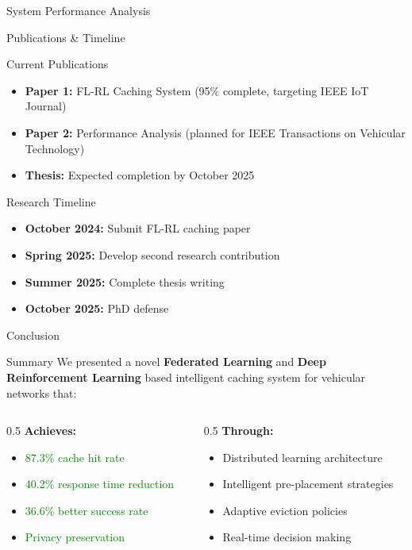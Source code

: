 \documentclass[aspectratio=169]{beamer}
\begin{document}
\begin{frame}{System Performance Analysis}
\begin{frame}{Publications \& Timeline}
\begin{block}{Current Publications}
\begin{itemize}
\item \textbf{Paper 1:} FL-RL Caching System (95\% complete, targeting IEEE IoT Journal)
\item \textbf{Paper 2:} Performance Analysis (planned for IEEE Transactions on Vehicular Technology)
\item \textbf{Thesis:} Expected completion by October 2025
\end{itemize}
\end{block}

\begin{block}{Research Timeline}
\begin{itemize}
\item \textbf{October 2024:} Submit FL-RL caching paper
\item \textbf{Spring 2025:} Develop second research contribution
\item \textbf{Summer 2025:} Complete thesis writing
\item \textbf{October 2025:} PhD defense
\end{itemize}
\end{block}
\end{frame}

\begin{frame}{Conclusion}
\begin{block}{Summary}
We presented a novel \textcolor{flblue}{\textbf{Federated Learning}} and \textcolor{rlgreen}{\textbf{Deep Reinforcement Learning}} based intelligent caching system for vehicular networks that:
\end{block}

\begin{columns}
\begin{column}{0.5\textwidth}
\textbf{Achieves:}
\begin{itemize}
\item \textcolor{green}{87.3\% cache hit rate}
\item \textcolor{green}{40.2\% response time reduction}
\item \textcolor{green}{36.6\% better success rate}
\item \textcolor{green}{Privacy preservation}
\end{itemize}
\end{column}
\begin{column}{0.5\textwidth}
\textbf{Through:}
\begin{itemize}
\item Distributed learning architecture
\item Intelligent pre-placement strategies
\item Adaptive eviction policies
\item Real-time decision making
\end{itemize}
\end{column}
\end{columns}


\end{frame}
\end{frame}
\end{document}
